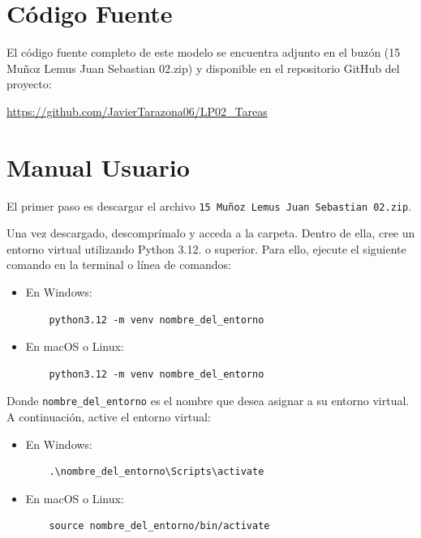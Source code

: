 \documentclass{article}
\begin{document}
\section{Código Fuente}\label{sec:cod}

El código fuente completo de este modelo se encuentra adjunto en el buzón
(15 Muñoz Lemus Juan Sebastian 02.zip)
y disponible en el repositorio GitHub del proyecto:

\begin{center}
  \url{https://github.com/JavierTarazona06/LP02_Tareas}
\end{center}


\section{Manual Usuario}\label{sec:man_u}

El primer paso es descargar el archivo \texttt{15 Muñoz Lemus Juan Sebastian 02.zip}.

Una vez descargado, descomprímalo y acceda a la carpeta. Dentro de ella, cree un
entorno virtual utilizando Python 3.12. o superior. Para ello, ejecute el siguiente
comando en
la terminal o línea de comandos:

\begin{itemize}
  \item En Windows:
        \begin{verbatim}
    python3.12 -m venv nombre_del_entorno
  \end{verbatim}
  \item En macOS o Linux:
        \begin{verbatim}
    python3.12 -m venv nombre_del_entorno
  \end{verbatim}
\end{itemize}

Donde \texttt{nombre\_del\_entorno} es el nombre que desea asignar a su entorno virtual.
A continuación, active el entorno virtual:

\begin{itemize}
  \item En Windows:
        \begin{verbatim}
    .\nombre_del_entorno\Scripts\activate
  \end{verbatim}
  \item En macOS o Linux:
        \begin{verbatim}
    source nombre_del_entorno/bin/activate
  \end{verbatim}
\end{itemize}
\end{document}
